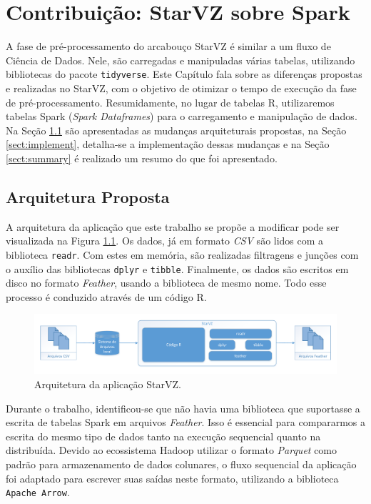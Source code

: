 \chapter{Contribuição: StarVZ sobre Spark} \label{ch:contribution}

A fase de pré-processamento do arcabouço StarVZ é similar a um fluxo de Ciência 
de Dados. Nele, são carregadas e manipuladas várias tabelas, utilizando 
bibliotecas do pacote \texttt{tidyverse}. Este Capítulo fala sobre as diferenças 
propostas e realizadas no StarVZ, com o objetivo de otimizar o tempo de 
execução da fase de pré-processamento. Resumidamente, no lugar de tabelas R, 
utilizaremos tabelas Spark (\emph{Spark Dataframes}) para o carregamento e 
manipulação de dados. Na Seção \ref{sect:arch} são apresentadas as mudanças 
arquiteturais propostas, na Seção \ref{sect:implement}, detalha-se a 
implementação dessas mudanças e na Seção \ref{sect:summary} é realizado um 
resumo do que foi apresentado.

\section{Arquitetura Proposta} \label{sect:arch}

A arquitetura da aplicação que este trabalho se propõe a modificar pode ser 
visualizada na Figura \ref{fig:starvz-app}. Os dados, já em formato 
\textit{CSV} são lidos com a biblioteca \texttt{readr}. Com estes em memória, 
são realizadas filtragens e junções com o auxílio das bibliotecas \texttt{dplyr} 
e \texttt{tibble}. Finalmente, os dados são escritos em disco no formato 
\textit{Feather}, usando a biblioteca de mesmo nome. Todo esse processo é 
conduzido através de um código R.

\begin{figure}[ht]
 \centerline{\includegraphics[width=1\textwidth]{./img/starvz-arch.pdf}}
 \caption{Arquitetura da aplicação StarVZ.}
 \label{fig:starvz-app}
\end{figure}

Durante o trabalho, identificou-se que não havia uma biblioteca que suportasse a 
escrita de tabelas Spark em arquivos \textit{Feather}. Isso é essencial para 
compararmos a escrita do mesmo tipo de dados tanto na execução sequencial quanto 
na distribuída. Devido ao ecossistema Hadoop utilizar o formato \textit{Parquet} 
\cite{ref:parquet} como padrão para armazenamento de dados colunares, o fluxo 
sequencial da aplicação foi adaptado para escrever suas saídas neste formato, 
utilizando a biblioteca \texttt{Apache Arrow}.

